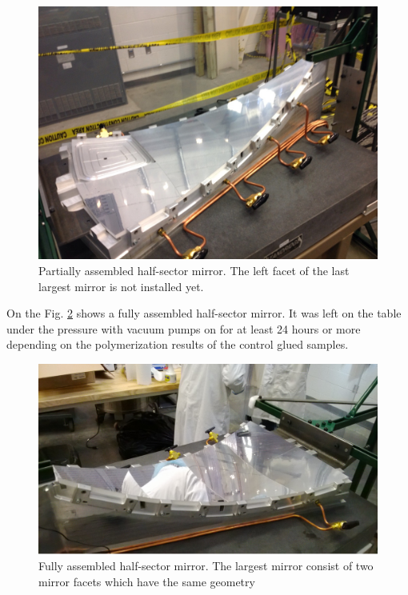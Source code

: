 \begin{figure}[ht]
    \centering
    \includegraphics[width=1.0\linewidth]{images/Partial_Half-sector.png}
    \caption{Partially assembled half-sector mirror. The left facet of the last largest mirror is not installed yet.}
    \label{fig:Partial_Half-sector}
\end{figure} 

On the Fig. \ref{fig:Half-sector} shows a fully assembled half-sector mirror. It was left on the table under the pressure with vacuum pumps on for at least 24 hours or more depending on the polymerization results of the control glued samples. 

\begin{figure}[ht]
    \centering
    \includegraphics[width=1.0\linewidth]{images/Half-sector.png}
    \caption{Fully assembled half-sector mirror. The largest mirror consist of two mirror facets which have the same geometry}
    \label{fig:Half-sector}
\end{figure}

